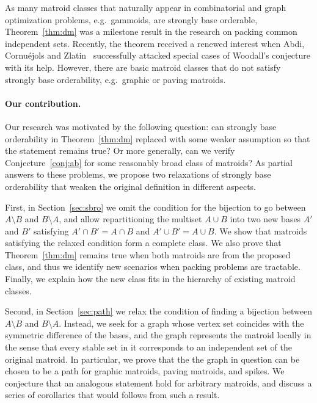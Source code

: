 \documentclass[11pt,a4paper]{article}
\theoremstyle{plain}
\theoremstyle{definition}
\begin{document}
As many matroid classes that naturally appear in combinatorial and graph optimization problems, e.g.\ gammoids, are strongly base orderable, Theorem~\ref{thm:dm} was a milestone result in the research on packing common independent sets. Recently, the theorem received a renewed interest when Abdi, Cornu\'ejols and Zlatin~\cite{abdi2022packing} successfully attacked special cases of Woodall's conjecture with its help. However, there are basic matroid classes that do not satisfy strongly base orderability, e.g.\ graphic or paving matroids.   

\paragraph{Our contribution.} Our research was motivated by the following question: can strongly base orderability in Theorem~\ref{thm:dm} replaced with some weaker assumption so that the statement remains true? Or more generally, can we verify Conjecture~\ref{conj:ab} for some reasonably broad class of matroids? As partial answers to these problems, we propose two relaxations of strongly base orderability that weaken the original definition in different aspects. 

First, in Section~\ref{sec:sbro} we omit the condition for the bijection to go between $A\setminus B$ and $B\setminus A$, and allow repartitioning the multiset $A\cup B$ into two new bases $A'$ and $B'$ satisfying $A'\cap B'=A\cap B$ and $A'\cup B'=A\cup B$. We show that matroids satisfying the relaxed condition form a complete class. We also prove that Theorem~\ref{thm:dm} remains true when both matroids are from the proposed class, and thus we identify new scenarios when packing problems are tractable. Finally, we explain how the new class fits in the hierarchy of existing matroid classes.

Second, in Section~\ref{sec:path} we relax the condition of finding a bijection between $A\setminus B$ and $B\setminus A$. Instead, we seek for a graph whose vertex set coincides with the symmetric difference of the bases, and the graph represents the matroid locally in the sense that every stable set in it corresponds to an independent set of the original matroid. In particular, we prove that the the graph in question can be chosen to be a path for graphic matroids, paving matroids, and spikes. We conjecture that an analogous statement hold for arbitrary matroids, and discuss a series of corollaries that would follows from such a result. 

\end{document}
